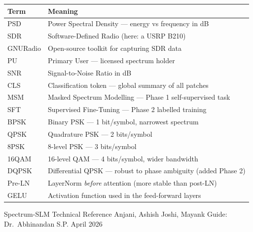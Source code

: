 \documentclass[11pt,a4paper]{article}
\begin{document}
\begin{center}
\renewcommand{\arraystretch}{1.25}
\begin{tabular}{ll}
\toprule
\textbf{Term} & \textbf{Meaning} \\
\midrule
PSD      & Power Spectral Density — energy vs frequency in dB \\
SDR      & Software-Defined Radio (here: a USRP B210) \\
GNURadio & Open-source toolkit for capturing SDR data \\
PU       & Primary User — licensed spectrum holder \\
SNR      & Signal-to-Noise Ratio in dB \\
CLS      & Classification token — global summary of all patches \\
MSM      & Masked Spectrum Modelling — Phase 1 self-supervised task \\
SFT      & Supervised Fine-Tuning — Phase 2 labelled training \\
BPSK     & Binary PSK — 1 bit/symbol, narrowest spectrum \\
QPSK     & Quadrature PSK — 2 bits/symbol \\
8PSK     & 8-level PSK — 3 bits/symbol \\
16QAM    & 16-level QAM — 4 bits/symbol, wider bandwidth \\
DQPSK    & Differential QPSK — robust to phase ambiguity (added Phase 2) \\
Pre-LN   & LayerNorm \emph{before} attention (more stable than post-LN) \\
GELU     & Activation function used in the feed-forward layers \\
\bottomrule
\end{tabular}
\end{center}

\vfill
\begin{center}\small\color{Gray}
  Spectrum-SLM Technical Reference \textbullet{}
  Anjani, Ashish Joshi, Mayank \textbullet{}
  Guide: Dr.~Abhinandan S.P. \textbullet{} April 2026
\end{center}
\end{document}
